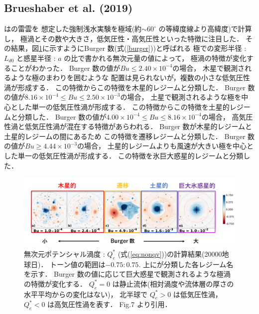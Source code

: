 \documentclass[a4j,12pt,openbib,oneside]{jreport}
\begin{document}
\subsection{Brueshaber et al. (2019)}
\label{sec:intro22}
\cite{Brueshaber2019}は\cite{Showman2007}の雷雲を
想定した強制浅水実験を極域(約$\sim 60^\circ$ の等緯度線より高緯度)で計算し，
極渦とその数や大きさ，低気圧性・高気圧性といった特徴に注目した．
その結果，図\ref{fig4}に示すようにBurger 数(式(\ref{burger}))と呼ばれる
極での変形半径 : $L_{d0}$ と惑星半径 : $a$ の比で書かれる無次元量の値によって，
極渦の特徴が変化することがわかった．
%
Burger 数の値が$Bu \leq 2.40 \times 10^{-4}$の場合，
木星で観測されるような極のまわりを囲むような
配置は見られないが，複数の小さな低気圧性渦が形成する．
この特徴からこの特徴を木星的レジームと分類した．
%
Burger 数の値が$8.16 \times 10^{-4 } \leq Bu \leq  2.50 \times 10^{-3}$の場合，
土星で観測されるような極を中心とした単一の低気圧性渦が形成する．
この特徴からこの特徴を土星的レジームと分類した．
%
Burger 数の値が$4.00 \times 10^{-4 } \leq  Bu \leq  8.16 \times 10^{-4}$の場合，
高気圧性渦と低気圧性渦が混在する特徴があらわれる．
Burger 数が木星的レジームと土星的レジームの間にあるため
この特徴を遷移レジームと分類した．
%
Burger 数の値が$Bu \geq 4.44 \times 10^{-3 }$の場合，
土星的レジームよりも風速が大きい極を中心とした単一の低気圧性渦が形成する．
この特徴を氷巨大惑星的レジームと分類した．
%
\begin{figure}[H]
  \begin{center}
    \includegraphics[clip,width=14cm]{./fig/intro/fig4_2.png}
    \caption{
      \footnotesize{無次元ポテンシャル渦度 : $Q_e^*$ (式(\ref{eq:nonqv}))の計算結果(20000地球日)．
トーン値の範囲は$-0.75 : 0.75$.
上に\cite{Brueshaber2019}が分類した各レジーム名を示す．
Burger 数の値に応じて巨大惑星で観測されるような極渦の特徴が変化する．
$Q_e^* = 0$ は静止流体(相対渦度や流体層の厚さの水平平均からの変化はない)，
北半球で $Q_e^* > 0$ は低気圧性渦，$Q_e^* < 0$ は高気圧性渦を表す．
\cite{Brueshaber2019} Fig.7 より引用．
      }
    }
    \label{fig4}
  \end{center}
\end{figure}
%
\def\intro3{研究目的}
\end{document}
